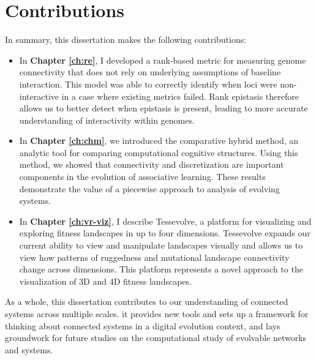 \section{Contributions}

In summary, this dissertation makes the following contributions:

\begin{itemize}
    \item In \textbf{Chapter \ref{ch:re}}, I developed a rank-based metric for measuring genome connectivity that does not rely on underlying assumptions of baseline interaction. This model was able to correctly identify when loci were non-interactive in a case where existing metrics failed. Rank epistasis therefore allows us to better detect when epistasis is present, leading to more accurate understanding of interactivity within genomes. 
    \item In \textbf{Chapter \ref{ch:chm}}, we introduced the comparative hybrid method, an analytic tool for comparing computational cognitive structures. Using this method, we showed that connectivity and discretization are important components in the evolution of associative learning. These results demonstrate the value of a piecewise approach to analysis of evolving systems. 
    \item In \textbf{Chapter \ref{ch:vr-viz}}, I describe Tessevolve, a platform for visualizing and exploring fitness landscapes in up to four dimensions. Tessevolve expands our current ability to view and manipulate landscapes visually and allows us to view how patterns of ruggedness and mutational landscape connectivity change across dimensions. This platform represents a novel approach to the visualization of 3D and 4D fitness landscapes. 
\end{itemize}

As a whole, this dissertation contributes to our understanding of connected systems across multiple scales. it provides new tools and sets up a framework for thinking about connected systems in a digital evolution context, and lays groundwork for future studies on the computational study of evolvable networks and systems.

